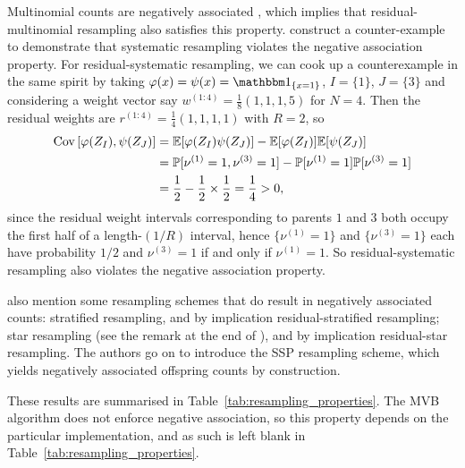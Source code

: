 Multinomial counts are negatively associated \parencite[Section 3.1]{joag1983}, which implies that residual-multinomial resampling also satisfies this property.
\textcite{gerber2017} construct a counter-example to demonstrate that systematic resampling violates the negative association property.
For residual-systematic resampling, we can cook up a counterexample in the same spirit by taking $\varphi(x)=\psi(x)=\I{x=1}$, $I=\{1\}$, $J=\{3\}$ and considering a weight vector say $w^{(1:4)} = \frac{1}{8}(1,1,1,5)$ for $N=4$. Then the residual weights are $r^{(1:4)} = \frac{1}{4}(1,1,1,1)$ with $R=2$, so
\begin{align*}
\operatorname{Cov} \left[ \varphi( Z_I) , \psi(Z_J) \right]
&= \mathbb{E}[ \varphi( Z_I) \psi(Z_J) ] - \mathbb{E}[\varphi( Z_I) ] \mathbb{E}[\psi(Z_J) ] \\
&=\mathbb{P}[\nu^{(1)}=1, \nu^{(3)}=1] - \mathbb{P}[\nu^{(1)}=1] \mathbb{P}[\nu^{(3)}=1] \\
&= \frac{1}{2} - \frac{1}{2} \times \frac{1}{2} 
= \frac{1}{4}
>0 ,
\end{align*}
since the residual weight intervals corresponding to parents $1$ and $3$ both occupy the first half of a length-$(1/R)$ interval, hence $\{\nu^{(1)}=1\}$ and $\{\nu^{(3)}=1\}$ each have probability $1/2$ and $\nu^{(3)}=1$ if and only if $\nu^{(1)}=1$. 
So residual-systematic resampling also violates the negative association property.

\textcite{gerber2017} also mention some resampling schemes that do result in negatively associated counts: stratified resampling, and by implication residual-stratified resampling; star resampling (see the remark at the end of \textcite[Section 3.2]{gerber2017}), and by implication residual-star resampling.
The authors go on to introduce the SSP resampling scheme, which yields negatively associated offspring counts by construction.

These results are summarised in Table~\ref{tab:resampling_properties}.
The MVB algorithm does not enforce negative association, so this property depends on the particular implementation, and as such is left blank in Table~\ref{tab:resampling_properties}.







